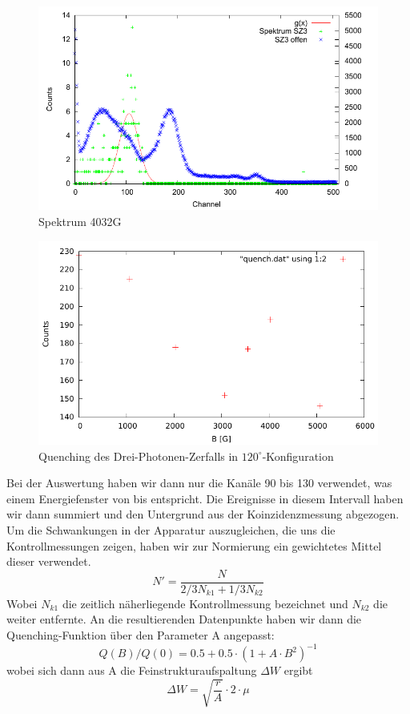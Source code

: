 \begin{figure}
 \includegraphics[width=\textwidth]{Graphen/quench/spektrum_4032.pdf}
 \caption{Spektrum 4032G}
\end{figure}

\begin{figure}
 \includegraphics[width=\textwidth]{Auswertung/quench.pdf}
 \caption{Quenching des Drei-Photonen-Zerfalls in $120^\circ$-Konfiguration}
\end{figure}
Bei der Auswertung haben wir dann nur die Kanäle 90 bis 130 verwendet, was einem Energiefenster von bis %
entspricht. Die Ereignisse in diesem Intervall haben wir dann summiert und den Untergrund aus der Koinzidenzmessung abgezogen. Um die Schwankungen in der Apparatur auszugleichen, die uns die Kontrollmessungen zeigen, haben wir zur Normierung ein gewichtetes Mittel dieser verwendet.
\begin{equation*}
 N' = \frac{N}{2/3 N_{k1} + 1/3 N_{k2}}
\end{equation*}
Wobei $N_{k1}$ die zeitlich näherliegende Kontrollmessung bezeichnet und $N_{k2}$ die weiter entfernte. An die resultierenden Datenpunkte haben wir dann die Quenching-Funktion über den Parameter A angepasst:
\begin{equation*}
 Q(B)/Q(0) = 0.5 + 0.5 \cdot (1 + A \cdot B^2)^{-1} 
\end{equation*}
wobei sich dann aus A die Feinstrukturaufspaltung $\Delta W$ ergibt
\begin{equation*}
 \Delta W = \sqrt{\frac{r}{A}} \cdot  2 \cdot \mu
\end{equation*}

